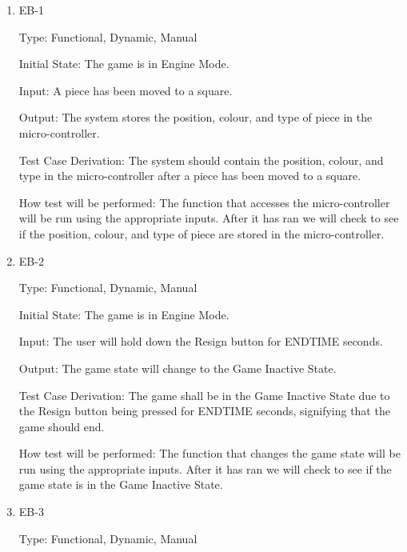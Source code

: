 \documentclass[12pt, titlepage]{article}
\begin{document}
    \begin{enumerate}
  
      \item{EB-1\\}
  
      Type: Functional, Dynamic, Manual
                          
      Initial State: The game is in Engine Mode.
                          
      Input: A piece has been moved to a square.
                          
      Output: The system stores the position, colour, and type of piece in the micro-controller.
                          
      Test Case Derivation: The system should contain the position, colour, and type in the micro-controller
      after a piece has been moved to a square.
  
      How test will be performed: The function that accesses the micro-controller will be run using the appropriate inputs.
      After it has ran we will check to see if the position, colour, and type of piece are stored in the micro-controller.  
  
      \item{EB-2\\}
  
      Type: Functional, Dynamic, Manual
                        
      Initial State: The game is in Engine Mode.
                          
      Input: The user will hold down the Resign button for ENDTIME seconds.
                          
      Output: The game state will change to the Game Inactive State.
                          
      Test Case Derivation: The game shall be in the Game Inactive State due to the Resign button being pressed for ENDTIME seconds, signifying that the game should end.
      
      How test will be performed: The function that changes the game state will be run using the appropriate inputs.
      After it has ran we will check to see if the game state is in the Game Inactive State.
  
      \item{EB-3\\}
  
      Type: Functional, Dynamic, Manual
                        

\end{enumerate}
\end{document}
